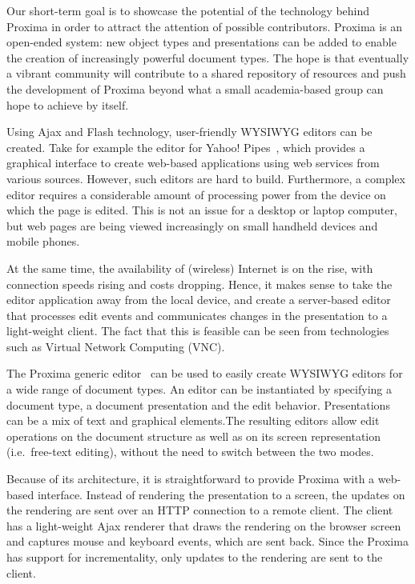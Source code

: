 \documentclass[10pt]{article}
\begin{document}
Our short-term goal is to showcase the potential of the technology behind Proxima in order to attract the attention of possible contributors. Proxima is an open-ended system: new object types and presentations can be added to enable the creation of increasingly powerful document types. The hope is that eventually a vibrant community will contribute to a shared repository of resources and push the development of Proxima beyond what a small academia-based group can hope to achieve by itself. 


\bc

Using Ajax and Flash technology, user-friendly WYSIWYG editors can be created. Take for example the editor for Yahoo! Pipes~\cite{yahoo08pipes}, which provides a graphical interface to create web-based applications using web services from various sources. However, such editors are hard to build. Furthermore, a complex editor requires a considerable amount of processing power from the device on which the page is edited. This is not an issue for a desktop or laptop computer, but web pages are being viewed increasingly on small handheld devices and mobile phones. 

At the same time, the availability of (wireless) Internet is on the rise, with connection speeds rising and costs dropping. Hence, it makes sense to take the editor application away from the local device, and create a server-based editor that processes edit events and communicates changes in the presentation to a light-weight client. The fact that this is feasible can be seen from technologies such as Virtual Network Computing (VNC).

The Proxima generic editor~\cite{schrage08proximaHome, schrage04proxima} can be used to easily create WYSIWYG editors for a wide range of document types. An editor can be instantiated by specifying a document type, a document presentation and the edit behavior. Presentations can be a mix of text and graphical elements.The resulting editors allow edit operations on the document structure as well as on its screen representation (i.e.\ free-text editing), without the need to switch between the two modes.

Because of its architecture, it is straightforward to provide Proxima with a web-based interface. Instead of rendering the presentation to a screen, the updates on the rendering are sent over an HTTP connection to a remote client. The client has a light-weight Ajax renderer that draws the rendering on the browser screen and captures mouse and keyboard events, which are sent back. Since the Proxima has support for incrementality, only updates to the rendering are sent to the client.
\end{document}
